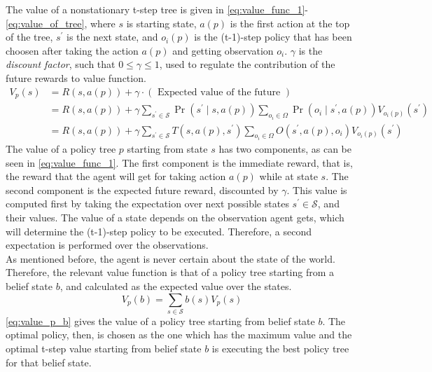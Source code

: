 The value of a nonstationary t-step tree is given in \autoref{eq:value_func_1}-\autoref{eq:value_of_tree}, where $ s $ is starting state, $ a(p) $ is the first action at the top of the tree, $ s^\prime $ is the next state, and $ o_{i}(p) $ is the (t-1)-step policy that has been choosen after taking the action $ a(p) $ and getting observation $ o_i $. $ \gamma $ is the \textit{discount factor}, such that $ 0\leq \gamma \leq 1 $, used to regulate the contribution of the future rewards to value function. \cite{Sutton2018}
\begin{align} 
V_{p}(s) &=R(s, a(p))+\gamma \cdot(\text { Expected value of the future }) \label{eq:value_func_1}\\
&=R(s, a(p))+\gamma \sum_{s^{\prime} \in \mathcal{S}} \operatorname{Pr}\left(s^{\prime} \mid s, a(p)\right) \sum_{o_{i} \in \Omega} \operatorname{Pr}\left(o_{i} \mid s^{\prime}, a(p)\right) V_{o_{i}(p)}\left(s^{\prime}\right) \label{eq:value_func_2}\\
&=R(s, a(p))+\gamma \sum_{s^{\prime} \in \mathcal{S}} T\left(s, a(p), s^{\prime}\right) \sum_{o_{i} \in \Omega} O\left(s^{\prime}, a(p), o_{i}\right) V_{o_{i}(p)}\left(s^{\prime}\right) 
\label{eq:value_of_tree}
\end{align}
The value of a policy tree $ p $ starting from state $ s $ has two components, as can be seen in \autoref{eq:value_func_1}. The first component is the immediate reward, that is, the reward that the agent will get for taking action $ a(p) $ while at state $ s $. The second component is the expected future reward, discounted by $ \gamma $. This value is computed first by taking the expectation over next possible states $ s^\prime \in \mathcal{S} $, and their values. The value of a state depends on the observation agent gets, which will determine the (t-1)-step policy to be executed. Therefore, a second expectation is performed over the observations. \\
As mentioned before, the agent is never certain about the state of the world. Therefore, the relevant value function is that of a policy tree starting from a belief state $ b $, and  calculated as the expected value over the states.
\begin{equation}
V_{p}(b)=\sum_{s \in \mathcal{S}} b(s) V_{p}(s)
\label{eq:value_p_b}
\end{equation}
\autoref{eq:value_p_b} gives the value of a policy tree starting from belief state $ b $. The optimal policy, then, is chosen as the one which has the maximum value and the optimal t-step value starting from belief state $ b $ is executing the best policy tree for that belief state.
